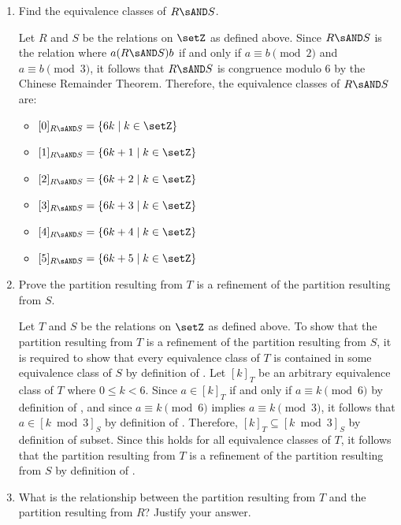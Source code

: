 \begin{enumerate}
\begin{enumerate}
    \item Find the equivalence classes of $R \sAND S$.
      \begin{subanswer}
        Let $R$ and $S$ be the relations on $\setZ$ as defined above. 
        Since $R \sAND S$ is the relation where $a (R \sAND S) b$ if and only if $a \equiv b \pmod{2}$ and $a \equiv b \pmod{3}$, 
        it follows that $R \sAND S$ is congruence modulo $6$ by the Chinese Remainder Theorem. 
        Therefore, the equivalence classes of $R \sAND S$ are:
        \begin{itemize}
          \item $[0]_{R \sAND S} = \{6k \mid k \in \setZ\}$
          \item $[1]_{R \sAND S} = \{6k+1 \mid k \in \setZ\}$
          \item $[2]_{R \sAND S} = \{6k+2 \mid k \in \setZ\}$
          \item $[3]_{R \sAND S} = \{6k+3 \mid k \in \setZ\}$
          \item $[4]_{R \sAND S} = \{6k+4 \mid k \in \setZ\}$
          \item $[5]_{R \sAND S} = \{6k+5 \mid k \in \setZ\}$
        \end{itemize}
      \end{subanswer}
    \item Prove the partition resulting from $T$ is a refinement of the partition resulting from $S$.
      \begin{subprove}
        Let $T$ and $S$ be the relations on $\setZ$ as defined above. 
        To show that the partition resulting from $T$ is a refinement of the partition resulting from $S$, 
        it is required to show that every equivalence class of $T$ is contained in some equivalence class of $S$ by definition of .
        Let $[k]_T$ be an arbitrary equivalence class of $T$ where $0 \leq k < 6$. 
        Since $a \in [k]_T$ if and only if $a \equiv k \pmod{6}$ by definition of , 
        and since $a \equiv k \pmod{6}$ implies $a \equiv k \pmod{3}$, 
        it follows that $a \in [k \bmod 3]_S$ by definition of . 
        Therefore, $[k]_T \subseteq [k \bmod 3]_S$ by definition of subset. 
        Since this holds for all equivalence classes of $T$, it follows that the partition resulting from $T$ is a refinement of the partition resulting from $S$ by definition of .
      \end{subprove}
    \item What is the relationship between the partition resulting from $T$ and the partition resulting from $R$? Justify your answer.

\end{enumerate}
\end{enumerate}
